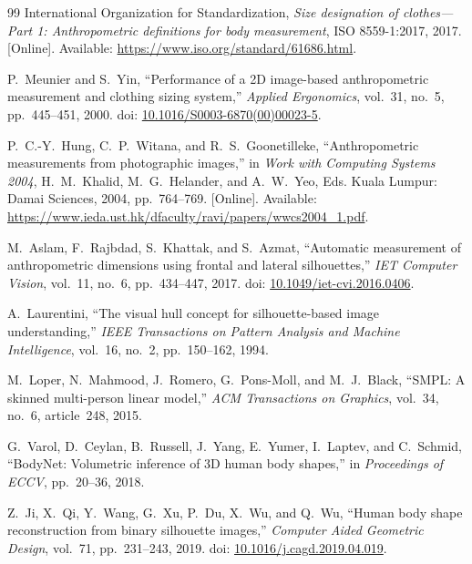 \documentclass[11pt,a4paper]{article}
\numberwithin{equation}{section}
\begin{document}
\begin{thebibliography}{99}
\small
\setlength{\itemsep}{0.1em}
\setlength{\parskip}{0pt}
International Organization for Standardization, \emph{Size designation of clothes---Part 1: Anthropometric definitions for body measurement}, ISO 8559-1:2017, 2017. [Online]. Available: \url{https://www.iso.org/standard/61686.html}.

P.~Meunier and S.~Yin, ``Performance of a 2D image-based anthropometric measurement and clothing sizing system,'' \emph{Applied Ergonomics}, vol.~31, no.~5, pp.~445--451, 2000. doi: \href{https://doi.org/10.1016/S0003-6870(00)00023-5}{10.1016/S0003-6870(00)00023-5}.

P.~C.-Y.~Hung, C.~P.~Witana, and R.~S.~Goonetilleke, ``Anthropometric measurements from photographic images,'' in \emph{Work with Computing Systems 2004}, H.~M.~Khalid, M.~G.~Helander, and A.~W.~Yeo, Eds. Kuala Lumpur: Damai Sciences, 2004, pp.~764--769. [Online]. Available: \url{https://www.ieda.ust.hk/dfaculty/ravi/papers/wwcs2004_1.pdf}.

M.~Aslam, F.~Rajbdad, S.~Khattak, and S.~Azmat, ``Automatic measurement of anthropometric dimensions using frontal and lateral silhouettes,'' \emph{IET Computer Vision}, vol.~11, no.~6, pp.~434--447, 2017. doi: \href{https://doi.org/10.1049/iet-cvi.2016.0406}{10.1049/iet-cvi.2016.0406}.

A.~Laurentini, ``The visual hull concept for silhouette-based image understanding,'' \emph{IEEE Transactions on Pattern Analysis and Machine Intelligence}, vol.~16, no.~2, pp.~150--162, 1994.

M.~Loper, N.~Mahmood, J.~Romero, G.~Pons-Moll, and M.~J.~Black, ``SMPL: A skinned multi-person linear model,'' \emph{ACM Transactions on Graphics}, vol.~34, no.~6, article~248, 2015.

G.~Varol, D.~Ceylan, B.~Russell, J.~Yang, E.~Yumer, I.~Laptev, and C.~Schmid, ``BodyNet: Volumetric inference of 3D human body shapes,'' in \emph{Proceedings of ECCV}, pp.~20--36, 2018.

Z.~Ji, X.~Qi, Y.~Wang, G.~Xu, P.~Du, X.~Wu, and Q.~Wu, ``Human body shape reconstruction from binary silhouette images,'' \emph{Computer Aided Geometric Design}, vol.~71, pp.~231--243, 2019. doi: \href{https://doi.org/10.1016/j.cagd.2019.04.019}{10.1016/j.cagd.2019.04.019}.


\end{thebibliography}
\end{document}
